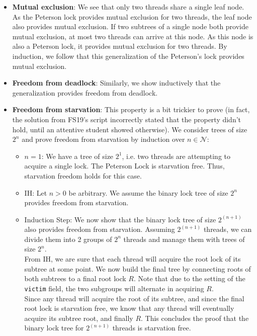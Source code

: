 \documentclass[main]{subfiles}
\begin{document}
\begin{ExerciseList}
            \Question
                \begin{itemize}
                    \item \textbf{Mutual exclusion}: We see that only two threads share a single leaf node. As the Peterson lock provides mutual exclusion for two threads, the leaf node also provides mutual exclusion. If two subtrees of a single node both provide mutual exclusion, at most two threads can arrive at this node. As this node is also a Peterson lock, it provides mutual exclusion for two threads. By induction, we follow that this generalization of the Peterson's lock provides mutual exclusion.
                    \item \textbf{Freedom from deadlock}: Similarly, we show inductively that the generalization provides freedom from deadlock.
                    \item \textbf{Freedom from starvation}: This property is a bit trickier to prove (in fact, the solution from FS19's script incorrectly stated that the property didn't hold, until an attentive student showed otherwise). We consider trees of size $2^n$ and prove freedom from starvation by induction over $n\in \mathcal{N}$:\\[3mm]
                    \begin{itemize}
                        \item $n=1$: We have a tree of size $2^1$, i.e. two threads are attempting to acquire a single lock. The Peterson Lock is starvation free. Thus, starvation freedom holds for this case.
                        \item IH: Let $n>0$ be arbitrary. We assume the binary lock tree of size $2^n$ provides freedom from starvation.
                        \item Induction Step: We now show that the binary lock tree of size $2^(n+1)$ also provides freedom from starvation. Assuming $2^(n+1)$ threads, we can divide them into 2 groups of $2^n$ threads and manage them with trees of size $2^n$. \\
                        From IH, we are sure that each thread will acquire the root lock of its subtree at some point.
                        We now build the final tree by connecting roots of both subtrees to a final root lock $R$. Note that due to the setting of the \texttt{victim} field, the two subgroups will alternate in acquiring $R$.\\
                        Since any thread will acquire the root of its subtree, and since the final root lock is starvation free, we know that any thread will eventually acquire its subtree root, and finally $R$. This concludes the proof that the binary lock tree for $2^(n+1)$ threads is starvation free.
                    \end{itemize}
                \end{itemize}
        

\end{ExerciseList}
\end{document}
